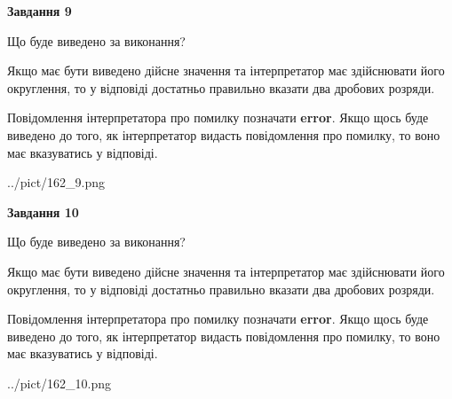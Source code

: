 \documentclass[12pt, ukrainian]{article}
\begin{document}
{\begin {Large}
{\begin {center}\textbf{Завдання 9}\end {center}}\par
Що буде виведено за виконання? \par

Якщо має бути виведено дійсне значення та інтерпретатор має здійснювати його округлення, 
то у відповіді достатньо правильно вказати два дробових розряди.

Повідомлення інтерпретатора про помилку позначати \textbf{error}.
Якщо щось буде виведено до того, як інтерпретатор видасть повідомлення про помилку, 
то воно має вказуватись у відповіді. \par

\begin{center}
	{../pict/162_9.png}
\end{center}
\newpage

{\begin {center}\textbf{Завдання 10}\end {center}}\par
Що буде виведено за виконання? \par

Якщо має бути виведено дійсне значення та інтерпретатор має здійснювати його округлення, 
то у відповіді достатньо правильно вказати два дробових розряди.

Повідомлення інтерпретатора про помилку позначати \textbf{error}.
Якщо щось буде виведено до того, як інтерпретатор видасть повідомлення про помилку, 
то воно має вказуватись у відповіді. \par

\begin{center}
	{../pict/162_10.png}
\end{center}
\newpage

\end {Large}}
\end{document}
